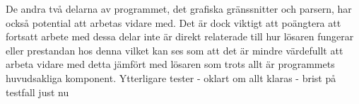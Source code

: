 \newline \newline
De andra två delarna av programmet, det grafiska gränssnitter och parsern, har också potential att arbetas vidare med. Det är dock viktigt att poängtera att fortsatt arbete med dessa delar inte är direkt relaterade till hur lösaren fungerar eller prestandan hos denna vilket kan ses som att det är mindre värdefullt att arbeta vidare med detta jämfört med lösaren som trots allt är programmets huvudsakliga komponent.
\newline \newline
Ytterligare tester - oklart om allt klaras - brist på testfall just nu \newline